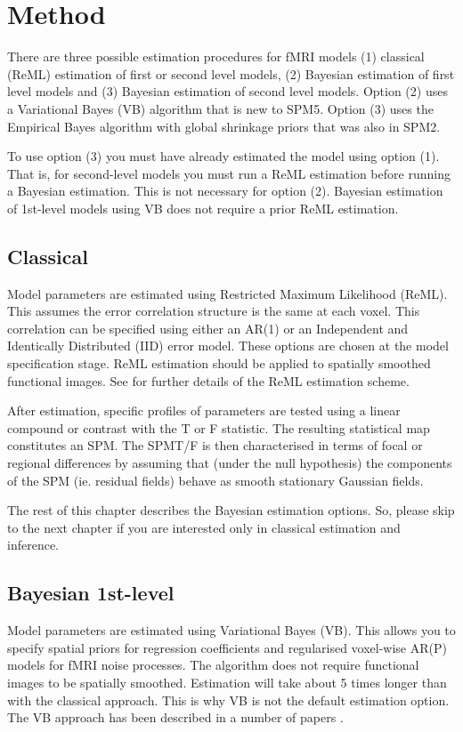\section{Method}
There are three possible estimation procedures for fMRI models (1) classical (ReML) estimation of first or second level models, (2) Bayesian estimation of first level models and (3) Bayesian estimation of second level models. Option (2) uses a Variational Bayes (VB) algorithm that is new to SPM5. Option (3) uses the Empirical Bayes algorithm with global shrinkage priors that was also in SPM2. 

                                                                                                            

To use option (3) you must have already estimated the model using option (1). That is, for second-level models you must run a ReML estimation before running a Bayesian estimation. This is not necessary for option (2). Bayesian estimation of 1st-level models using VB does not require a prior ReML estimation.


\subsection{Classical}
Model parameters are estimated using Restricted Maximum Likelihood (ReML). This assumes the error correlation structure is the same at each voxel. This correlation can be specified using either an AR(1) or an Independent and Identically Distributed (IID) error model. These options are chosen at the model specification stage. ReML estimation should be applied to spatially smoothed functional images. See \cite{peb1,peb2} for 
further details of the ReML estimation scheme.

                                                                        After estimation, specific profiles of parameters are tested using a linear compound or contrast with the T or F statistic. The resulting statistical map constitutes an SPM. The SPM{T}/{F} is then characterised in terms of focal or regional differences by assuming that (under the null hypothesis) the components of the SPM (ie. residual fields) behave as smooth stationary Gaussian fields.

The rest of this chapter describes the Bayesian estimation options.
So, please skip to the next chapter if you are interested only in 
classical estimation and inference. 

\subsection{Bayesian 1st-level}
Model parameters are estimated using Variational Bayes (VB). This allows you to specify spatial priors for regression coefficients and regularised voxel-wise AR(P) models for fMRI noise processes. The algorithm does not require functional images to be spatially smoothed. Estimation will take about 5 times longer than with the classical approach. This is why VB is not the default estimation option. The VB approach has been described in a number of papers \cite{vb_fmri_ar,vb2,vb3,vb4}.
                                                          
